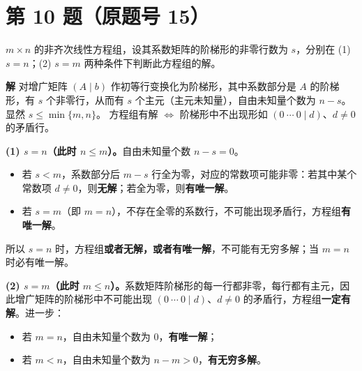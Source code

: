 \documentclass[11pt,a4paper]{ctexart}
\newenvironment{problem}[1]
  {\par\medskip\noindent\textbf{#1}\quad}
  {\par}
\newenvironment{solution}
  {\par\noindent\textbf{解}\quad}
  {\par}
\begin{document}
\section*{第 10 题（原题号 15）}

\begin{problem}{}$m\times n$ 的非齐次线性方程组，设其系数矩阵的阶梯形的非零行数为 $s$，分别在 (1) $s=n$；(2) $s=m$ 两种条件下判断此方程组的解。\end{problem}

\begin{solution}
对增广矩阵 $(A\mid b)$ 作初等行变换化为阶梯形，其中系数部分是 $A$ 的阶梯形，有 $s$ 个非零行，从而有 $s$ 个主元（主元未知量），自由未知量个数为 $n-s$。显然 $s\le\min\{m,n\}$。
方程组有解 $\iff$ 阶梯形中不出现形如 $(0\ \cdots\ 0\mid d)$、$d\ne0$ 的矛盾行。

\textbf{(1) $s=n$（此时 $n\le m$）。}自由未知量个数 $n-s=0$。
\begin{itemize}
  \item 若 $s<m$，系数部分后 $m-s$ 行全为零，对应的常数项可能非零：若其中某个常数项 $d\ne0$，则\textbf{无解}；若全为零，则\textbf{有唯一解}。
  \item 若 $s=m$（即 $m=n$），不存在全零的系数行，不可能出现矛盾行，方程组\textbf{有唯一解}。
\end{itemize}
所以 $s=n$ 时，方程组\textbf{或者无解，或者有唯一解}，不可能有无穷多解；当 $m=n$ 时必有唯一解。

\textbf{(2) $s=m$（此时 $m\le n$）。}系数矩阵阶梯形的每一行都非零，每行都有主元，因此增广矩阵的阶梯形中不可能出现 $(0\ \cdots\ 0\mid d)$、$d\ne0$ 的矛盾行，方程组\textbf{一定有解}。进一步：
\begin{itemize}
  \item 若 $m=n$，自由未知量个数为 $0$，\textbf{有唯一解}；
  \item 若 $m<n$，自由未知量个数为 $n-m>0$，\textbf{有无穷多解}。
\end{itemize}
\end{solution}
\end{document}
